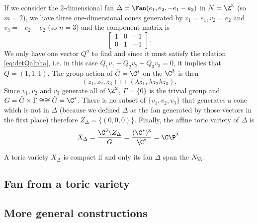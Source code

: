 \documentclass{worksheetclass}
\begin{document}
        \begin{examp*}
            If we consider the $2$-dimensional fan $\Delta=\Fan(e_1,e_2,-e_1-e_2)$ in $N=\Z^3$ (so $m=2$), we have three one-dimensional cones generated by $v_1=e_1,v_2=e_2$ and $v_3=-e_2-e_2$ (so $n=3$) and the component matrix is
            \begin{equation}
                \begin{bmatrix}
                    1 & 0 & -1 \\
                    0 & 1 & -1
                \end{bmatrix}.
            \end{equation}
            We only have one vector $Q^a$ to find and since it must satisfy the relation \eqref{eq:detQalpha}, i.e. in this case $Q_1v_1+Q_2v_2+Q_3v_3=0$, it implies that $Q=(1,1,1)$. The group action of $\tilde{G}=\C^*$ on the $\C^3$ is then
            \begin{equation}
                (z_1,z_2,z_3)\mapsto (\lambda z_1,\lambda z_2\lambda z_3).
            \end{equation}
            Since $v_1,v_2$ and $v_3$ generate all of $\Z^2$, $\Gamma=\{0\}$ is the trivial group and $G=\tilde{G}\times\Gamma\cong\cong\tilde{G}=\C^*$. There is no subset of $\{v_1,v_2,v_3\}$ that generates a cone which is not in $\Delta$ (because we defined $\Delta$ as the fan generated by those vectors in the first place) therefore $Z_\Delta=\{(0,0,0)\}$.  Finally, the affine toric variety of $\Delta$ is
            \begin{equation}
                X_\Delta=\frac{\C^3\backslash Z_\Delta}{G}=\frac{(\C^*)^3}{\C^*}=\C\P^2.
            \end{equation}
        \end{examp*}

        \begin{prop*}
            A toric variety $X_\Delta$ is compact if and only its fan $\Delta$ span the $N_\R$.
        \end{prop*}

    \subsection{Fan from a toric variety}

    \subsection{More general constructions}
\end{document}
